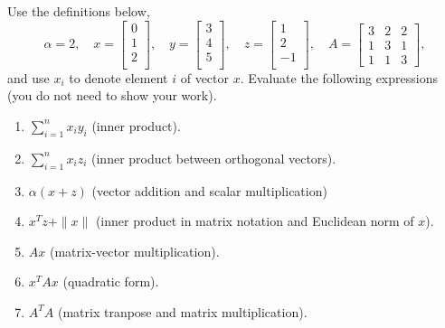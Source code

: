 \documentclass{article}
\def\blu#1{{\color{blu}#1}}
\def\norm#1{\|#1\|}
\def\enum#1{\begin{enumerate}#1\end{enumerate}}
\begin{document}
Use the definitions below,
\[
\alpha = 2,\quad
x = \left[\begin{array}{c}
0\\
1\\
2\\
\end{array}\right], \quad
y = \left[\begin{array}{c}
3\\
4\\
5\\
\end{array}\right],\quad
z = \left[\begin{array}{c}
1\\
2\\
-1\\
\end{array}\right],\quad
A = \left[\begin{array}{ccc}
3 & 2 & 2\\
1 & 3 & 1\\
1 & 1 & 3
\end{array}\right],
\]
and use $x_i$ to denote element $i$ of vector $x$.
\blu{Evaluate the following expressions} (you do not need to show your work).
\enum{
\item $\sum_{i=1}^n x_iy_i$ (inner product).
\item $\sum_{i=1}^n x_iz_i$ (inner product between orthogonal vectors).
\item $\alpha(x+z)$ (vector addition and scalar multiplication)
\item $x^Tz + \norm{x}$ (inner product in matrix notation and Euclidean norm of $x$).
\item $Ax$ (matrix-vector multiplication).
\item $x^TAx$ (quadratic form).
\item $A^TA$ (matrix tranpose and matrix multiplication).
}
\end{document}
